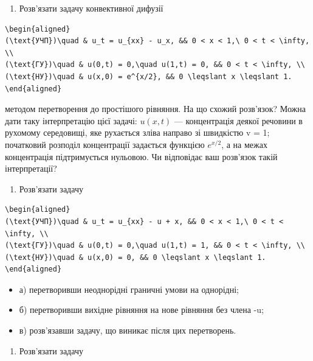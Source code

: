 \documentclass[
  ukrainian,
]{article}
\providecommand{\tightlist}{%
  \setlength{\itemsep}{0pt}\setlength{\parskip}{0pt}}
\begin{document}
\begin{enumerate}
\def\labelenumi{\arabic{enumi}.}
\tightlist
\item
  Розв'язати задачу конвективної дифузії
\end{enumerate}

\begin{verbatim}
\begin{aligned}
(\text{УЧП})\quad & u_t = u_{xx} - u_x, && 0 < x < 1,\ 0 < t < \infty, \\
(\text{ГУ})\quad & u(0,t) = 0,\quad u(1,t) = 0, && 0 < t < \infty, \\
(\text{НУ})\quad & u(x,0) = e^{x/2}, && 0 \leqslant x \leqslant 1.
\end{aligned}
\end{verbatim}

методом перетворення до простішого рівняння. На що схожий розв'язок?
Можна дати таку інтерпретацію цієї задачі: \(u(x,t)\) --- концентрація
деякої речовини в рухомому середовищі, яке рухається зліва направо зі
швидкістю v = 1; початковий розподіл концентрації задається функцією
\(e^{x/2}\), а на межах концентрація підтримується нульовою. Чи
відповідає ваш розв'язок такій інтерпретації?

\begin{enumerate}
\def\labelenumi{\arabic{enumi}.}
\setcounter{enumi}{1}
\tightlist
\item
  Розв'язати задачу
\end{enumerate}

\begin{verbatim}
\begin{aligned}
(\text{УЧП})\quad & u_t = u_{xx} - u + x, && 0 < x < 1,\ 0 < t < \infty, \\
(\text{ГУ})\quad & u(0,t) = 0,\quad u(1,t) = 1, && 0 < t < \infty, \\
(\text{НУ})\quad & u(x,0) = 0, && 0 \leqslant x \leqslant 1.
\end{aligned}
\end{verbatim}

\begin{itemize}
\item
  а) перетворивши неоднорідні граничні умови на однорідні;
\item
  б) перетворивши вихідне рівняння на нове рівняння без члена -u;
\item
  в) розв'язавши задачу, що виникає після цих перетворень.
\end{itemize}

\begin{enumerate}
\def\labelenumi{\arabic{enumi}.}
\setcounter{enumi}{2}
\tightlist
\item
  Розв'язати задачу
\end{enumerate}
\end{document}
